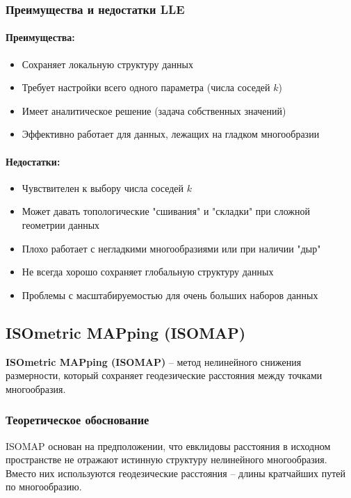 \documentclass[a4paper,12pt]{article}
\begin{document}
\subsubsection{Преимущества и недостатки LLE}

\paragraph{Преимущества:}
\begin{itemize}
    \item Сохраняет локальную структуру данных
    \item Требует настройки всего одного параметра (числа соседей $k$)
    \item Имеет аналитическое решение (задача собственных значений)
    \item Эффективно работает для данных, лежащих на гладком многообразии
\end{itemize}

\paragraph{Недостатки:}
\begin{itemize}
    \item Чувствителен к выбору числа соседей $k$
    \item Может давать топологические "сшивания" и "складки" при сложной геометрии данных
    \item Плохо работает с негладкими многообразиями или при наличии "дыр"
    \item Не всегда хорошо сохраняет глобальную структуру данных
    \item Проблемы с масштабируемостью для очень больших наборов данных
\end{itemize}

\subsection{ISOmetric MAPping (ISOMAP)}

\textbf{ISOmetric MAPping (ISOMAP)} -- метод нелинейного снижения размерности, который сохраняет геодезические расстояния между точками многообразия.

\subsubsection{Теоретическое обоснование}

ISOMAP основан на предположении, что евклидовы расстояния в исходном пространстве не отражают истинную структуру нелинейного многообразия. Вместо них используются геодезические расстояния -- длины кратчайших путей по многообразию.
\end{document}
